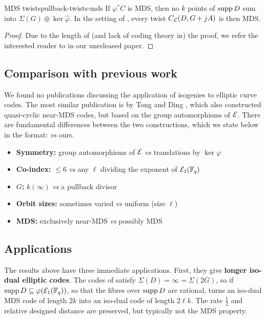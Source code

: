 \documentclass[twocolumn, 11pt]{scrartcl}
\begin{document}
\begin{corollary}{MDS twists}{pullback-twists-mds}
    If $\varphi^*C$ is MDS, then no $k$ points of $\operatorname{supp} D$ sum into $\Sigma(G)\oplus\ker\hat\varphi$. In the setting of , every twist $C_\mathcal{L}(D,G+jA)$ is then MDS.
\end{corollary}

\begin{proof}
    Due to the length of (and lack of coding theory in) the proof, we refer the interested reader to \cite[Cor.~17]{upcoming-paper} in our unreleased paper.
\end{proof}

\subsection{Comparison with previous work}

We found no publications discussing the application of isogenies to elliptic curve codes. The most similar publication is by Tong and Ding \cite{tong2013quasicyclic}, which also constructed quasi-cyclic near-MDS codes, but based on the group automorphisms of $\mathcal{E}$. There are fundamental differences between the two constructions, which we state below in the format: \cite{tong2013quasicyclic} \textit{vs} ours.

\begin{itemize}
    \item \textbf{Symmetry:} group automorphisms of $\mathcal{E}$ \textit{vs} translations by $\ker\varphi$
    \item \textbf{Co-index:} $\leq 6$ \textit{vs} any $\ell$ dividing the exponent of $\mathcal{E}_1(\mathbb{F}_q)$
    \item \textbf{$G$:} $k(\infty)$ \textit{vs} a pullback divisor
    \item \textbf{Orbit sizes:} sometimes varied \textit{vs} uniform (size $\ell$)
    \item \textbf{MDS:} exclusively near-MDS \textit{vs} possibly MDS
\end{itemize}

\subsection{Applications}

The results above have three immediate applications. First, they give \textbf{longer iso-dual elliptic codes}. The codes of  satisfy $\Sigma(D)=\infty=\Sigma(2G)$, so if $\operatorname{supp} D\subseteq\varphi(\mathcal{E}_1(\mathbb{F}_q))$, so that the fibres over $\operatorname{supp} D$ are rational,  turns an iso-dual MDS code of length $2k$ into an iso-dual code of length $2\ell k$. The rate $\frac12$ and relative designed distance are preserved, but typically not the MDS property.
\end{document}
